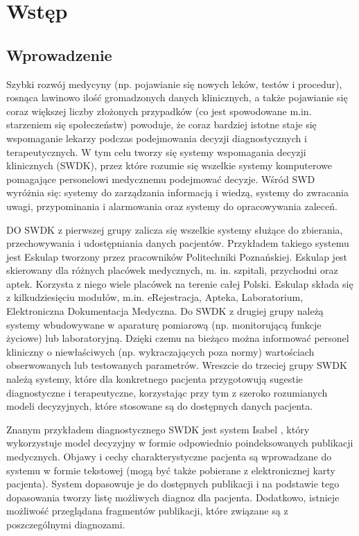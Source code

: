\chapter{Wstęp}
\section{Wprowadzenie}

\begin{spacing}{1.5}

Szybki rozwój medycyny (np. pojawianie się nowych leków, testów i procedur), rosnąca lawinowo ilość gromadzonych danych klinicznych, a także pojawianie się coraz większej liczby złożonych przypadków (co jest spowodowane m.in. starzeniem się społeczeństw) powoduje, że coraz bardziej istotne staje się wspomaganie lekarzy podczas podejmowania decyzji diagnostycznych i terapeutycznych. W tym celu tworzy się systemy wspomagania decyzji klinicznych (SWDK), przez które rozumie się wszelkie systemy komputerowe pomagające personelowi medycznemu podejmować decyzje\cite{Musen06}. Wśród SWD wyróżnia się: systemy do zarządzania informacją i wiedzą, systemy do zwracania uwagi, przypominania i alarmowania oraz systemy do opracowywania zaleceń.

DO SWDK z pierwszej grupy zalicza się wszelkie systemy służące do zbierania, przechowywania i udostępniania danych pacjentów. Przykładem takiego systemu jest Eskulap tworzony przez pracowników Politechniki Poznańskiej. Eskulap jest skierowany dla różnych placówek medycznych, m. in. szpitali, przychodni oraz aptek. Korzysta z niego wiele placówek na terenie całej Polski. Eskulap składa się z kilkudziesięciu modułów, m.in. eRejestracja, Apteka, Laboratorium, Elektroniczna Dokumentacja Medyczna. Do SWDK z drugiej grupy należą systemy wbudowywane w aparaturę pomiarową (np. monitorującą funkcje życiowe) lub laboratoryjną. Dzięki czemu na bieżąco można informować personel kliniczny o niewłaściwych (np. wykraczających poza normy) wartościach obserwowanych lub testowanych parametrów. Wreszcie do trzeciej grupy SWDK należą systemy, które dla konkretnego pacjenta przygotowują sugestie diagnostyczne i terapeutyczne, korzystając przy tym z szeroko rozumianych modeli decyzyjnych, które stosowane są do dostępnych danych pacjenta. 

Znanym przykładem diagnostycznego SWDK jest system Isabel \cite{Isabel}, który wykorzystuje model decyzyjny w formie odpowiednio poindeksowanych publikacji medycznych. Objawy i cechy charakterystyczne pacjenta są wprowadzane do systemu w formie tekstowej (mogą być także pobierane z elektronicznej karty pacjenta). System dopasowuje je do dostępnych publikacji i na podstawie tego dopasowania tworzy listę możliwych diagnoz dla pacjenta. Dodatkowo, istnieje możliwość przeglądana fragmentów publikacji, które związane są z poszczególnymi diagnozami. 


\end{spacing}
